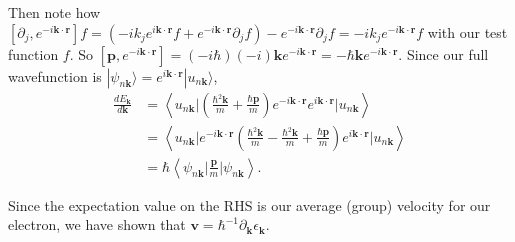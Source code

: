 \documentclass[12pt]{revtex4-2}
\begin{document}
Then note how $[\partial_j,e^{-i\mathbf{k}\cdot\mathbf{r}}]f = (-ik_je^{i\mathbf{k}\cdot\mathbf{r}}f + e^{-i\mathbf{k}\cdot\mathbf{r}}\partial_j f) - e^{-i\mathbf{k}\cdot\mathbf{r}}\partial_j f = -ik_je^{-i\mathbf{k}\cdot\mathbf{r}}f$ with our test function $f$.  So $[\mathbf{p},e^{-i\mathbf{k}\cdot\mathbf{r}}] = (-i\hbar)(-i)\mathbf{k}e^{-i\mathbf{k}\cdot\mathbf{r}} = -\hbar\mathbf{k}e^{-i\mathbf{k}\cdot\mathbf{r}}$.  Since our full wavefunction is $|\psi_{n\mathbf{k}}\rangle = e^{i\mathbf{k}\cdot\mathbf{r}}|u_{n\mathbf{k}}\rangle$,
\begin{align}
    \frac{dE_\mathbf{k}}{d\mathbf{k}} &= \left\langle u_{n\mathbf{k}} \bigg| \left(\frac{\hbar^2 \mathbf{k}}{m} + \frac{\hbar\mathbf{p}}{m}\right) e^{-i\mathbf{k}\cdot\mathbf{r}}e^{i\mathbf{k}\cdot\mathbf{r}} \bigg| u_{n\mathbf{k}} \right\rangle \\
    &= \left\langle u_{n\mathbf{k}} \bigg|e^{-i\mathbf{k}\cdot\mathbf{r}} \left(\frac{\hbar^2 \mathbf{k}}{m} - \frac{\hbar^2 \mathbf{k}}{m} + \frac{\hbar\mathbf{p}}{m}\right) e^{i\mathbf{k}\cdot\mathbf{r}} \bigg| u_{n\mathbf{k}} \right\rangle \\
    &= \hbar\left\langle \psi_{n\mathbf{k}} \bigg| \frac{\mathbf{p}}{m} \bigg| \psi_{n\mathbf{k}} \right\rangle.
\end{align}

Since the expectation value on the RHS is our average (group) velocity for our electron, we have shown that $\mathbf{v} = \hbar^{-1}\partial_\mathbf{k}\epsilon_\mathbf{k}$.
\end{document}
